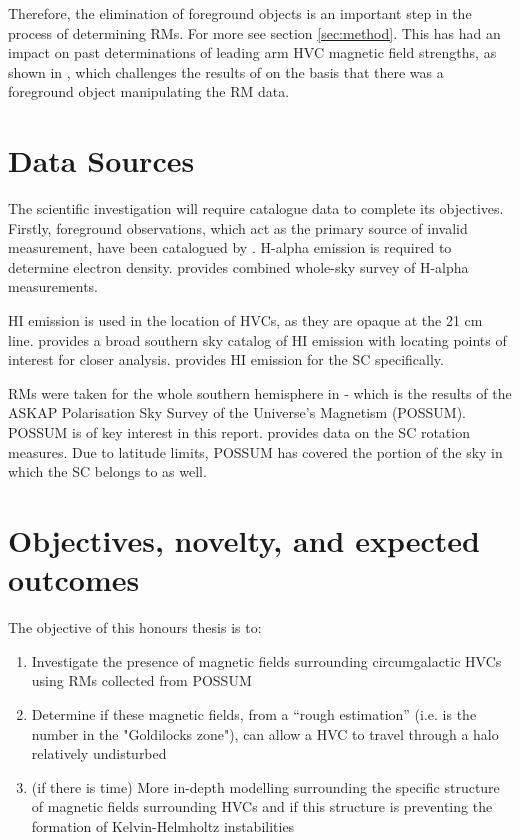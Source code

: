 Therefore, the elimination of foreground objects is an important step in the process of determining RMs. For more see section \ref{sec:method}. This has had an impact on past determinations of leading arm HVC magnetic field strengths, as shown in \citep{ID36}, which challenges the results of \citep{ID2} on the basis that there was a foreground object manipulating the RM data.

\section{Data Sources}
\label{sec:sources}

The scientific investigation will require catalogue data to complete its objectives. Firstly, foreground observations, which act as the primary source of invalid measurement, have been catalogued by \citep{ID44, ID45}. H-alpha emission is required to determine electron density. \citep{ID43} provides combined whole-sky survey of H-alpha measurements.

HI emission is used in the location of HVCs, as they are opaque at the 21 cm line. \citep{ID3, ID6} provides a broad southern sky catalog of HI emission with \citep{ID3} locating points of interest for closer analysis. \citep{ID28} provides HI emission for the SC specifically.

RMs were taken for the whole southern hemisphere in \citep{ID1} - which is the results of the ASKAP Polarisation Sky Survey of the Universe’s Magnetism (POSSUM). POSSUM is of key interest in this report. \citep{ID18} provides data on the SC rotation measures. Due to latitude limits, POSSUM has covered the portion of the sky in which the SC belongs to as well.

\section{Objectives, novelty, and expected outcomes}
\label{sec:objectives}

The objective of this honours thesis is to:
\begin{enumerate}
\item Investigate the presence of magnetic fields surrounding circumgalactic HVCs using RMs collected from POSSUM
\item Determine if these magnetic fields, from a “rough estimation” (i.e. is the number in the "Goldilocks zone"), can allow a HVC to travel through a halo relatively undisturbed
\item (if there is time) More in-depth modelling surrounding the specific structure of magnetic fields surrounding HVCs and if this structure is preventing the formation of Kelvin-Helmholtz instabilities
\end{enumerate}

